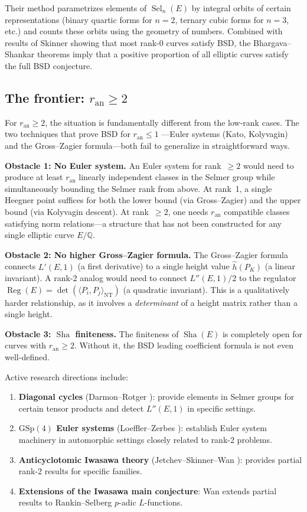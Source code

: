 \documentclass[11pt]{article}
\DeclareMathOperator{\Reg}{Reg}
\DeclareMathOperator{\Sha}{Sha}
\DeclareMathOperator{\Sel}{Sel}
\begin{document}
\noindent
Their method parametrizes elements of $\Sel_n(E)$ by integral orbits of
certain representations (binary quartic forms for $n = 2$, ternary cubic forms
for $n = 3$, etc.) and counts these orbits using the geometry of numbers.
Combined with results of Skinner \cite{Skinner} showing that most rank-0 curves
satisfy BSD, the Bhargava--Shankar theorems imply that a positive proportion of
all elliptic curves satisfy the full BSD conjecture.

\subsection{The frontier: $r_{\mathrm{an}} \geq 2$}

For $r_{\mathrm{an}} \geq 2$, the situation is fundamentally different from the
low-rank cases.  The two techniques that prove BSD for $r_{\mathrm{an}} \leq 1$%
---Euler systems (Kato, Kolyvagin) and the Gross--Zagier formula---both fail to
generalize in straightforward ways.

\textbf{Obstacle 1: No Euler system.}  An Euler system for rank~$\geq 2$ would
need to produce at least $r_{\mathrm{an}}$ linearly independent classes in the
Selmer group while simultaneously bounding the Selmer rank from above.  At
rank~1, a single Heegner point suffices for both the lower bound (via
Gross--Zagier) and the upper bound (via Kolyvagin descent).  At rank~$\geq 2$,
one needs $r_{\mathrm{an}}$ compatible classes satisfying norm relations---a
structure that has not been constructed for any single elliptic curve
$E/\mathbb{Q}$.

\textbf{Obstacle 2: No higher Gross--Zagier formula.}  The Gross--Zagier
formula connects $L'(E,1)$ (a first derivative) to a single height value
$\hat{h}(P_K)$ (a linear invariant).  A rank-2 analog would need to connect
$L''(E,1)/2$ to the regulator $\Reg(E) = \det(\langle P_i, P_j
\rangle_{\mathrm{NT}})$ (a quadratic invariant).  This is a qualitatively
harder relationship, as it involves a \emph{determinant} of a height matrix
rather than a single height.

\textbf{Obstacle 3: $\Sha$ finiteness.}  The finiteness of $\Sha(E)$ is
completely open for curves with $r_{\mathrm{an}} \geq 2$.  Without it, the
BSD leading coefficient formula is not even well-defined.

Active research directions include:
\begin{enumerate}
  \item \textbf{Diagonal cycles} (Darmon--Rotger \cite{DR}): provide
    elements in Selmer groups for certain tensor products and detect
    $L''(E,1)$ in specific settings.
  \item \textbf{$\mathrm{GSp}(4)$ Euler systems} (Loeffler--Zerbes
    \cite{LZ}): establish Euler system machinery in automorphic settings
    closely related to rank-2 problems.
  \item \textbf{Anticyclotomic Iwasawa theory} (Jetchev--Skinner--Wan
    \cite{JSW}): provides partial rank-2 results for specific families.
  \item \textbf{Extensions of the Iwasawa main conjecture}: Wan \cite{Wan}
    extends partial results to Rankin--Selberg $p$-adic $L$-functions.
\end{enumerate}
\end{document}
